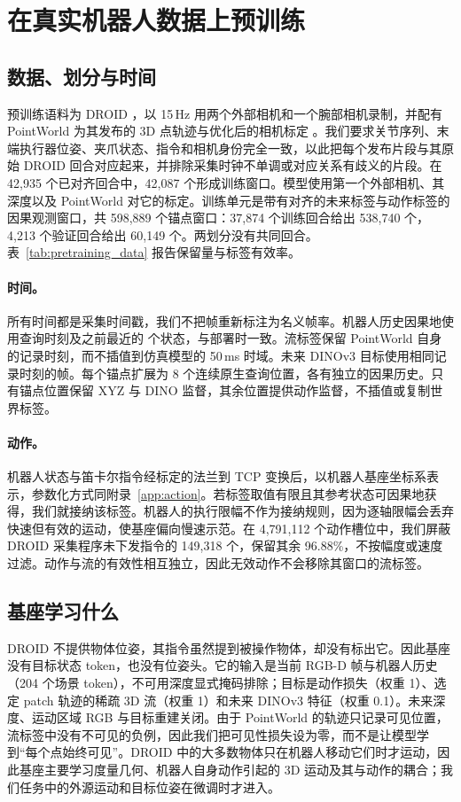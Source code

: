\section{在真实机器人数据上预训练}
\label{app:pretraining}

\subsection{数据、划分与时间}
\label{app:droid}
预训练语料为 DROID \cite{droid}，以 15\,Hz 用两个外部相机和一个腕部相机录制，并配有 PointWorld 为其发布的 3D 点轨迹与优化后的相机标定 \cite{pointworld}。我们要求关节序列、末端执行器位姿、夹爪状态、指令和相机身份完全一致，以此把每个发布片段与其原始 DROID 回合对应起来，并排除采集时钟不单调或对应关系有歧义的片段。在 42{,}935 个已对齐回合中，42{,}087 个形成训练窗口。模型使用第一个外部相机、其深度以及 PointWorld 对它的标定。训练单元是带有对齐的未来标签与动作标签的因果观测窗口，共 598{,}889 个锚点窗口：37{,}874 个训练回合给出 538{,}740 个，4{,}213 个验证回合给出 60{,}149 个。两划分没有共同回合。表~\ref{tab:pretraining_data} 报告保留量与标签有效率。



\paragraph{时间。}所有时间都是采集时间戳，我们不把帧重新标注为名义帧率。机器人历史因果地使用查询时刻及之前最近的 \cfgHistoryLen{} 个状态，与部署时一致。流标签保留 PointWorld 自身的记录时刻，而不插值到仿真模型的 50\,ms 时域。未来 DINOv3 目标使用相同记录时刻的帧。每个锚点扩展为 8 个连续原生查询位置，各有独立的因果历史。只有锚点位置保留 XYZ 与 DINO 监督，其余位置提供动作监督，不插值或复制世界标签。

\paragraph{动作。}机器人状态与笛卡尔指令经标定的法兰到 TCP 变换后，以机器人基座坐标系表示，参数化方式同附录~\ref{app:action}。若标签取值有限且其参考状态可因果地获得，我们就接纳该标签。机器人的执行限幅不作为接纳规则，因为逐轴限幅会丢弃快速但有效的运动，使基座偏向慢速示范。在 4{,}791{,}112 个动作槽位中，我们屏蔽 DROID 采集程序未下发指令的 149{,}318 个，保留其余 96.88\%，不按幅度或速度过滤。动作与流的有效性相互独立，因此无效动作不会移除其窗口的流标签。

\subsection{基座学习什么}
\label{app:droid_target}
DROID 不提供物体位姿，其指令虽然提到被操作物体，却没有标出它。因此基座没有目标状态 token，也没有位姿头。它的输入是当前 RGB-D 帧与机器人历史（204 个场景 token），不可用深度显式掩码排除；目标是动作损失（权重 1）、选定 patch 轨迹的稀疏 3D 流（权重 1）和未来 DINOv3 特征（权重 0.1）。未来深度、运动区域 RGB 与目标重建关闭。由于 PointWorld 的轨迹只记录可见位置，流标签中没有不可见的负例，因此我们把可见性损失设为零，而不是让模型学到“每个点始终可见”。DROID 中的大多数物体只在机器人移动它们时才运动，因此基座主要学习度量几何、机器人自身动作引起的 3D 运动及其与动作的耦合；我们任务中的外源运动和目标位姿在微调时才进入。

